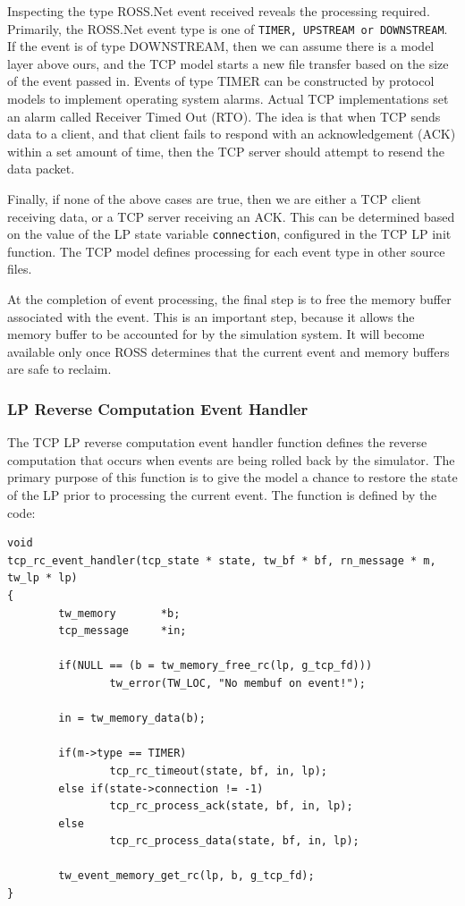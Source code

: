 \documentclass[12pt]{article}
\begin{document}
Inspecting the type ROSS.Net event received reveals the processing required.
Primarily, the ROSS.Net event type is one of {\tt TIMER, UPSTREAM or
  DOWNSTREAM}.  If the event is of type DOWNSTREAM, then we can assume there
is a model layer above ours, and the TCP model starts a new file transfer
based on the size of the event passed in.  Events of type TIMER can be
constructed by protocol models to implement operating system alarms.  Actual
TCP implementations set an alarm called Receiver Timed Out (RTO).  The idea is
that when TCP sends data to a client, and that client fails to respond with an
acknowledgement (ACK) within a set amount of time, then the TCP server should
attempt to resend the data packet.

Finally, if none of the above cases are true, then we are either a TCP client
receiving data, or a TCP server receiving an ACK.  This can be determined
based on the value of the LP state variable {\tt connection}, configured in
the TCP LP init function.  The TCP model defines processing for each event
type in other source files.

At the completion of event processing, the final step is to free the memory
buffer associated with the event.  This is an important step, because it
allows the memory buffer to be accounted for by the simulation system.  It
will become available only once ROSS determines that the current event and
memory buffers are safe to reclaim.

\subsubsection{LP Reverse Computation Event Handler}

The TCP LP reverse computation event handler function defines the reverse
computation that occurs when events are being rolled back by the simulator.
The primary purpose of this function is to give the model a chance to restore
the state of the LP prior to processing the current event.  The function is
defined by the code:

\begin{small}
\begin{verbatim}
void
tcp_rc_event_handler(tcp_state * state, tw_bf * bf, rn_message * m, tw_lp * lp)
{
        tw_memory       *b;
        tcp_message     *in;

        if(NULL == (b = tw_memory_free_rc(lp, g_tcp_fd)))
                tw_error(TW_LOC, "No membuf on event!");

        in = tw_memory_data(b);

        if(m->type == TIMER)
                tcp_rc_timeout(state, bf, in, lp);
        else if(state->connection != -1)
                tcp_rc_process_ack(state, bf, in, lp);
        else
                tcp_rc_process_data(state, bf, in, lp);

        tw_event_memory_get_rc(lp, b, g_tcp_fd);
}
\end{verbatim}
\end{small}
\end{document}
